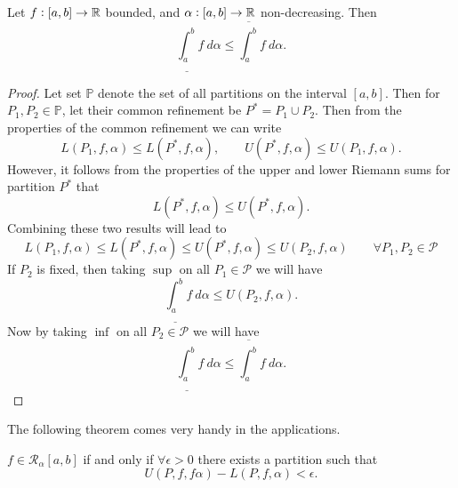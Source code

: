 \begin{proposition}
	Let $f:[a,b] \to \mathbb{R}$ bounded, and $\alpha:[a,b] \to \mathbb{R}$ non-decreasing.
	Then 
	\[ \underline{\int_a^b} f\ d\alpha \leq \overline{\int_a^b} f\ d\alpha. \]
		\label{thm:LowerIntLessThanUpperIng_RS}
\end{proposition}
\begin{proof}
	
	Let set $\mathbb{P}$ denote the set of all partitions on the interval $[a,b]$. Then for $P_1, P_2 \in \mathbb{P}$, let their common refinement be $P^* = P_1 \cup P_2$. Then from the properties of the common refinement we can write
	\[  L(P_1,f,\alpha) \leq L(P^*,f, \alpha), \qquad U(P^*, f,\alpha) \leq U(P_1, f, \alpha). \]
	However, it follows from the properties of the upper and lower Riemann sums for partition $P^*$ that
	\[ L(P^*,f,\alpha) \leq U(P^*,f,\alpha). \]
	Combining these two results will lead to 
	\[ L(P_1,f,\alpha) \leq L(P^*,f,\alpha)\leq U(P^*,f,\alpha) \leq U(P_2,f,\alpha) \qquad \forall P_1,P_2 \in \mathcal{P} \]
	If $P_2$ is fixed, then taking $\sup$ on all $P_1 \in \mathcal{P}$ we will have
	\[ \underline{\int_{a}^{b}}f\ d\alpha \leq U(P_2,f,\alpha).\]
	Now by taking $\inf$ on all $P_2 \in \mathcal{P}$ we will have
	\[ \underline{\int_{a}^{b}}f\ d\alpha \leq \overline{\int_{a}^{b}}f\ d\alpha. \]
\end{proof}
The following theorem comes very handy in the applications.
\begin{theorem}
	$f \in \mathcal{R}_\alpha[a,b]$ if and only if $\forall \epsilon>0$ there exists a partition such that 
	\[ U(P,f,f\alpha) - L(P,f,\alpha) < \epsilon. \]
\end{theorem}
